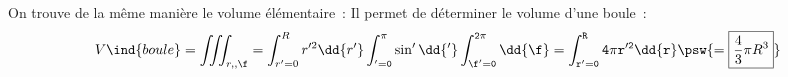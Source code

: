 \documentclass[../../main/main.tex]{subfiles}
\begin{document}
On trouve de la même manière le volume élémentaire~:
\psw{
  \[
    \boxed{\dd{V} = r^{2}\sin(\theta)\dd{r}\dd{\tt}\dd{\f}}
  \]
}
Il permet de déterminer le volume d'une boule~:
\[
  V\ind{boule}
  = \iiint_{r,\tt,\f}
	= \int_{r'=0}^{R} r'^2\dd{r'}
	\int_{\tt' = 0}^{\pi} \sin\tt'\dd{\tt'}
	\int_{\f'=0}^{2\pi} \dd{\f}
	= \int_{r'=0}^{R} 4\pi r'^2 \dd{r}
	\psw{
	  = \boxed{\frac{4}{3}\pi R^3}
	}
\]
\end{document}
